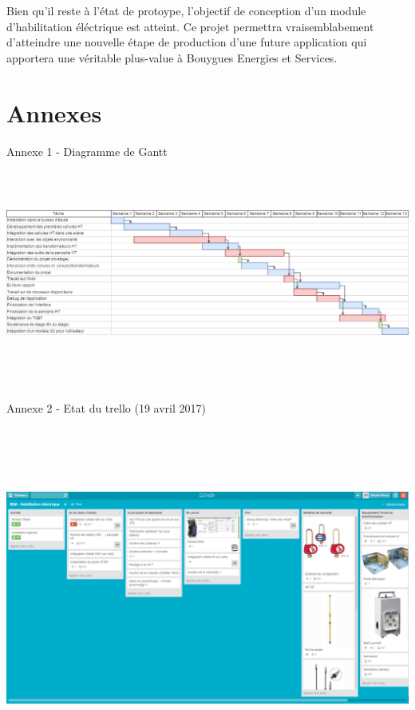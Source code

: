 \documentclass[a4paper]{article}
\begin{document}
    Bien qu'il reste à l'état de protoype, l'objectif de conception d'un module d'habilitation éléctrique est atteint. Ce projet permettra vraisemblabement d'atteindre une nouvelle étape de production d'une future application qui apportera une véritable plus-value à Bouygues Energies et Services. \\

    \newpage
    \section{Annexes}

    \centering
    \huge Annexe 1 - Diagramme de Gantt \\
    \vspace{10pt}
    \includegraphics[width=16.25cm,height=7.5cm]{img/GanttStage}

    \huge Annexe 2 - Etat du trello (19 avril 2017) \\
    \vspace{10pt}
    \includegraphics[width=16.25cm,height=12cm]{img/trello1}
\end{document}
